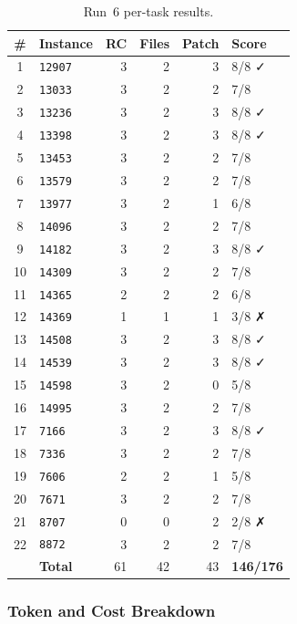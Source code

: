 \begin{table}[h]
\centering
\small
\caption{Run~6 per-task results.}\label{tab:r6-tasks}
\setlength{\tabcolsep}{4pt}
\begin{tabular}{clrrrl}
\toprule
\textbf{\#} & \textbf{Instance} & \textbf{RC} & \textbf{Files} & \textbf{Patch} & \textbf{Score} \\
\midrule
 1 & \texttt{12907} & 3 & 2 & 3 & 8/8 ✓ \\
 2 & \texttt{13033} & 3 & 2 & 2 & 7/8 \\
 3 & \texttt{13236} & 3 & 2 & 3 & 8/8 ✓ \\
 4 & \texttt{13398} & 3 & 2 & 3 & 8/8 ✓ \\
 5 & \texttt{13453} & 3 & 2 & 2 & 7/8 \\
 6 & \texttt{13579} & 3 & 2 & 2 & 7/8 \\
 7 & \texttt{13977} & 3 & 2 & 1 & 6/8 \\
 8 & \texttt{14096} & 3 & 2 & 2 & 7/8 \\
 9 & \texttt{14182} & 3 & 2 & 3 & 8/8 ✓ \\
10 & \texttt{14309} & 3 & 2 & 2 & 7/8 \\
11 & \texttt{14365} & 2 & 2 & 2 & 6/8 \\
12 & \texttt{14369} & 1 & 1 & 1 & 3/8 ✗ \\
13 & \texttt{14508} & 3 & 2 & 3 & 8/8 ✓ \\
14 & \texttt{14539} & 3 & 2 & 3 & 8/8 ✓ \\
15 & \texttt{14598} & 3 & 2 & 0 & 5/8 \\
16 & \texttt{14995} & 3 & 2 & 2 & 7/8 \\
17 & \texttt{7166}  & 3 & 2 & 3 & 8/8 ✓ \\
18 & \texttt{7336}  & 3 & 2 & 2 & 7/8 \\
19 & \texttt{7606}  & 2 & 2 & 1 & 5/8 \\
20 & \texttt{7671}  & 3 & 2 & 2 & 7/8 \\
21 & \texttt{8707}  & 0 & 0 & 2 & 2/8 ✗ \\
22 & \texttt{8872}  & 3 & 2 & 2 & 7/8 \\
\midrule
   & \textbf{Total} & 61 & 42 & 43 & \textbf{146/176} \\
\bottomrule
\end{tabular}
\end{table}

\subsubsection{Token and Cost Breakdown}

